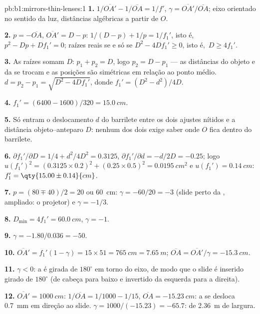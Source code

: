 \begin{solution}{pb:b1:mirrors-thin-lenses:1}
\textbf{1.} $1/\overline{OA'} - 1/\overline{OA} = 1/f'$,
$\gamma = \overline{OA'}/\overline{OA}$; eixo orientado no sentido da luz,
distâncias algébricas a partir de $O$.

\textbf{2.} $p = -\overline{OA}$, $\overline{OA'} = D - p$:
$1/(D - p) + 1/p = 1/f_1'$, isto é,\ $p^2 - Dp + Df_1' = 0$; raízes reais se e só se
$D^2 - 4Df_1' \geq 0$, isto é,\ $D \geq 4f_1'$.

\textbf{3.} As raízes somam $D$: $p_1 + p_2 = D$, logo $p_2 = D - p_1$ ---
as distâncias do objeto e da  se trocam e as posições são simétricas em relação ao
ponto médio. $d = p_2 - p_1 = \sqrt{D^2 - 4Df_1'}$, donde $f_1' = (D^2 -
d^2)/4D$.

\textbf{4.} $f_1' = (6400 - 1600)/320 = \qty{15.0}{cm}$.

\textbf{5.} Só entram o deslocamento $d$ do barrilete entre os dois
ajustes nítidos e a distância objeto--anteparo $D$: nenhum dos dois
exige saber onde $O$ fica dentro do barrilete.

\textbf{6.} $\partial f_1'/\partial D = 1/4 + d^2/4D^2 = 0.3125$,
$\partial f_1'/\partial d = -d/2D = -0.25$; logo
$u(f_1')^2 = (0.3125 \times 0.2)^2 + (0.25 \times 0.5)^2 =
\qty{0.0195}{cm^2}$ e $u(f_1') = \qty{0.14}{cm}$:
$f_1' = \qty{15.00\pm0.14}{cm}$.

\textbf{7.} $p = (80 \mp 40)/2 = 20$ ou \qty{60}{cm}: $\gamma =
-60/20 = -3$ (slide perto da , ampliado: o projetor) e
$\gamma = -1/3$.

\textbf{8.} $D_{\min} = 4f_1' = \qty{60.0}{cm}$, $\gamma = -1$.

\textbf{9.} $\gamma = -1.80/0.036 = -50$.

\textbf{10.} $\overline{OA'} = f_1'(1 - \gamma) = 15 \times 51 =
\qty{765}{cm} = \qty{7.65}{m}$; $\overline{OA} = \overline{OA'}/\gamma =
\qty{-15.3}{cm}$.

\textbf{11.} $\gamma < 0$: a  é girada de $180^\circ$
em torno do eixo, de modo que o slide é inserido girado de $180^\circ$ (de cabeça
para baixo e invertido da esquerda para a direita).

\textbf{12.} $\overline{OA'} = \qty{1000}{cm}$: $1/\overline{OA} = 1/1000
- 1/15$, $\overline{OA} = \qty{-15.23}{cm}$: a  se desloca \qty{0.7}{mm}
em direção ao slide. $\gamma = 1000/(-15.23) = -65.7$:  de
\qty{2.36}{m} de largura.


\end{solution}
